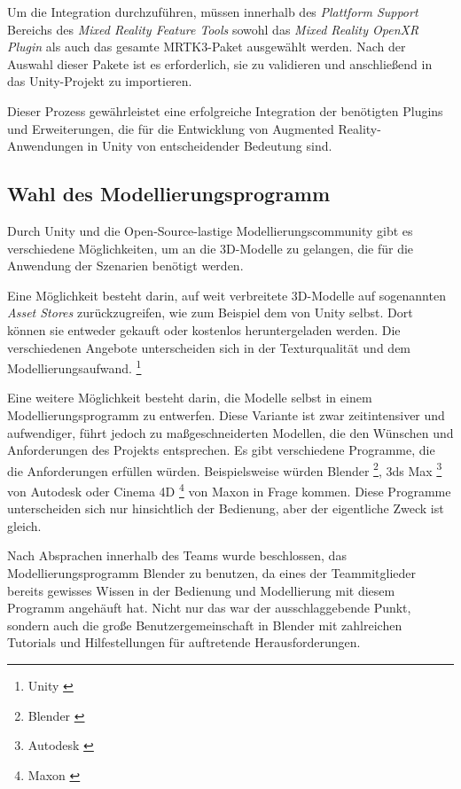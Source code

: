 Um die Integration durchzuführen, müssen innerhalb des \textit{Plattform Support} Bereichs des \textit{Mixed Reality Feature Tools}
sowohl das \textit{Mixed Reality OpenXR Plugin} als auch das gesamte MRTK3-Paket ausgewählt werden. Nach der Auswahl
dieser Pakete ist es erforderlich, sie zu validieren und anschließend in das Unity-Projekt zu importieren.

Dieser Prozess gewährleistet eine erfolgreiche Integration der benötigten Plugins und Erweiterungen, die für die Entwicklung
von Augmented Reality-Anwendungen in Unity von entscheidender Bedeutung sind.

\subsection{Wahl des Modellierungsprogramm} \label{sec:wahlblender} 
Durch Unity und die Open-Source-lastige Modellierungscommunity gibt es verschiedene Möglichkeiten, um an die 3D-Modelle
zu gelangen, die für die Anwendung der Szenarien benötigt werden.

Eine Möglichkeit besteht darin, auf weit verbreitete 3D-Modelle auf sogenannten \textit{Asset Stores} zurückzugreifen,
wie zum Beispiel dem von Unity selbst. Dort können sie entweder gekauft oder kostenlos heruntergeladen werden. Die
verschiedenen Angebote unterscheiden sich in der Texturqualität und dem Modellierungsaufwand.
\footnote{Unity \cite{Asset Stores}}

Eine weitere Möglichkeit besteht darin, die Modelle selbst in einem Modellierungsprogramm zu entwerfen. Diese Variante
ist zwar zeitintensiver und aufwendiger, führt jedoch zu maßgeschneiderten Modellen, die den Wünschen und Anforderungen
des Projekts entsprechen. Es gibt verschiedene Programme, die die Anforderungen erfüllen würden. Beispielsweise würden
Blender \footnote{Blender \cite{Blender Allgemein}}, 3ds Max \footnote{Autodesk \cite{3DS Max}} von Autodesk oder
Cinema 4D \footnote{Maxon \cite{Cinema 4D}} von Maxon in Frage kommen. Diese Programme unterscheiden sich nur hinsichtlich
der Bedienung, aber der eigentliche Zweck ist gleich.

Nach Absprachen innerhalb des Teams wurde beschlossen, das Modellierungsprogramm Blender zu benutzen, da eines der
Teammitglieder bereits gewisses Wissen in der Bedienung und Modellierung mit diesem Programm angehäuft hat. Nicht nur
das war der ausschlaggebende Punkt, sondern auch die große Benutzergemeinschaft in Blender mit zahlreichen Tutorials
und Hilfestellungen für auftretende Herausforderungen.

